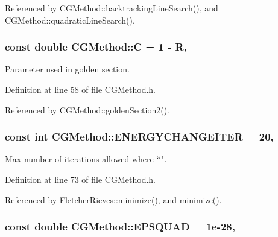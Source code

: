 Referenced by C\+G\+Method\+::backtracking\+Line\+Search(), and C\+G\+Method\+::quadratic\+Line\+Search().

\hypertarget{classCGMethod_af8587ca1c0394c244ce84fe8a6ad29ff}{
\subsubsection[{C}]{\setlength{\rightskip}{0pt plus 5cm}const double C\+G\+Method\+::\+C = 1 -\/ {\bf R}\hspace{0.3cm}{\ttfamily [protected]}, {\ttfamily [inherited]}}}\label{classCGMethod_af8587ca1c0394c244ce84fe8a6ad29ff}


Parameter used in golden section. 



Definition at line 58 of file C\+G\+Method.\+h.



Referenced by C\+G\+Method\+::golden\+Section2().

\hypertarget{classCGMethod_aaee1e11813855cc66c360f7cb3d9665a}{
\subsubsection[{E\+N\+E\+R\+G\+Y\+C\+H\+A\+N\+G\+E\+I\+T\+E\+R}]{\setlength{\rightskip}{0pt plus 5cm}const int C\+G\+Method\+::\+E\+N\+E\+R\+G\+Y\+C\+H\+A\+N\+G\+E\+I\+T\+E\+R = 20\hspace{0.3cm}{\ttfamily [protected]}, {\ttfamily [inherited]}}}\label{classCGMethod_aaee1e11813855cc66c360f7cb3d9665a}


Max number of iterations allowed where \char`\"{}\char`\"{}". 



Definition at line 73 of file C\+G\+Method.\+h.



Referenced by Fletcher\+Rieves\+::minimize(), and minimize().

\hypertarget{classCGMethod_adb2a688fe52a8729d703d81e52b9fdb3}{
\subsubsection[{E\+P\+S\+Q\+U\+A\+D}]{\setlength{\rightskip}{0pt plus 5cm}const double C\+G\+Method\+::\+E\+P\+S\+Q\+U\+A\+D = 1e-\/28\hspace{0.3cm}{\ttfamily [protected]}, {\ttfamily [inherited]}}}\label{classCGMethod_adb2a688fe52a8729d703d81e52b9fdb3}



